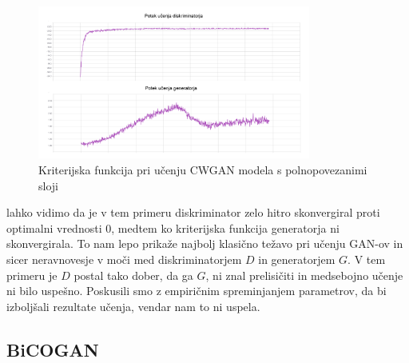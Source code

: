 \documentclass[12pt,a4paper,twoside]{article}
\theoremstyle{definition} %
\theoremstyle{plain} %
\numberwithin{equation}{section}  %
\begin{document}
\begin{figure}[ht]
  \centering
  \includegraphics[width=0.8\textwidth]{images/cwgan_dense_loss_graph.png}
 \caption[Kriterijska funkcija pri učenju CWGAN modela s polnopovezanimi sloji ]{Kriterijska funkcija pri učenju CWGAN modela s polnopovezanimi sloji}
  \label{fig:cwgan-dense-loss-graph}
\end{figure}
lahko vidimo da je v tem primeru diskriminator zelo hitro skonvergiral proti optimalni vrednosti 0, medtem ko kriterijska funkcija generatorja ni skonvergirala. To nam lepo prikaže najbolj klasično težavo pri učenju GAN-ov  in sicer neravnovesje v moči med diskriminatorjem  $D$  in generatorjem $G$. V tem primeru je $D$ postal tako dober, da ga $G$, ni znal prelisičiti in medsebojno učenje ni bilo uspešno. Poskusili smo z empiričnim spreminjanjem parametrov, da bi izboljšali rezultate učenja, vendar nam to ni uspela. 

\subsection{BiCOGAN}
\end{document}
